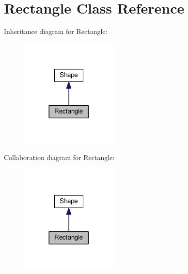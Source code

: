 \hypertarget{classRectangle}{}\section{Rectangle Class Reference}
\label{classRectangle}


Inheritance diagram for Rectangle\+:
\nopagebreak
\begin{figure}[H]
\begin{center}
\leavevmode
\includegraphics[width=141pt]{classRectangle__inherit__graph}
\end{center}
\end{figure}


Collaboration diagram for Rectangle\+:
\nopagebreak
\begin{figure}[H]
\begin{center}
\leavevmode
\includegraphics[width=141pt]{classRectangle__coll__graph}
\end{center}
\end{figure}
